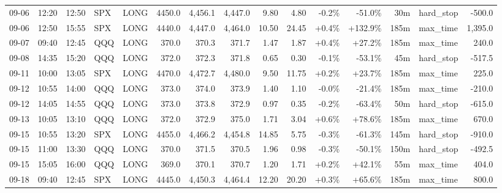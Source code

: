 \documentclass[11pt,a4paper,twoside]{article}
\begin{document}
\begin{landscape}
\begin{center}
\begin{longtable}{>{\color{txtmain}}l l l l l r r r r r r r r >{\color{txtmain}}l r}
09-06 & 12:20 & 12:50 & SPX & LONG & 4450.0 & 4,456.1 & 4,447.0 & 9.80 & 4.80 & \textcolor{lossred}{-0.2\%} & \textcolor{lossred}{-51.0\%} & 30m & hard\_stop & \textcolor{lossred}{-500.0} \\
09-06 & 12:50 & 15:55 & SPX & LONG & 4440.0 & 4,447.0 & 4,464.0 & 10.50 & 24.45 & \textcolor{wingreen}{+0.4\%} & \textcolor{wingreen}{+132.9\%} & 185m & max\_time & \textcolor{wingreen}{1,395.0} \\
09-07 & 09:40 & 12:45 & QQQ & LONG & 370.0 & 370.3 & 371.7 & 1.47 & 1.87 & \textcolor{wingreen}{+0.4\%} & \textcolor{wingreen}{+27.2\%} & 185m & max\_time & \textcolor{wingreen}{240.0} \\
09-08 & 14:35 & 15:20 & QQQ & LONG & 372.0 & 372.3 & 371.8 & 0.65 & 0.30 & \textcolor{lossred}{-0.1\%} & \textcolor{lossred}{-53.1\%} & 45m & hard\_stop & \textcolor{lossred}{-517.5} \\
09-11 & 10:00 & 13:05 & SPX & LONG & 4470.0 & 4,472.7 & 4,480.0 & 9.50 & 11.75 & \textcolor{wingreen}{+0.2\%} & \textcolor{wingreen}{+23.7\%} & 185m & max\_time & \textcolor{wingreen}{225.0} \\
09-12 & 10:55 & 14:00 & QQQ & LONG & 373.0 & 374.0 & 373.9 & 1.40 & 1.10 & \textcolor{lossred}{-0.0\%} & \textcolor{lossred}{-21.4\%} & 185m & max\_time & \textcolor{lossred}{-210.0} \\
09-12 & 14:05 & 14:55 & QQQ & LONG & 373.0 & 373.8 & 372.9 & 0.97 & 0.35 & \textcolor{lossred}{-0.2\%} & \textcolor{lossred}{-63.4\%} & 50m & hard\_stop & \textcolor{lossred}{-615.0} \\
09-13 & 10:05 & 13:10 & QQQ & LONG & 372.0 & 372.9 & 375.0 & 1.71 & 3.04 & \textcolor{wingreen}{+0.6\%} & \textcolor{wingreen}{+78.6\%} & 185m & max\_time & \textcolor{wingreen}{670.0} \\
09-15 & 10:55 & 13:20 & SPX & LONG & 4455.0 & 4,466.2 & 4,454.8 & 14.85 & 5.75 & \textcolor{lossred}{-0.3\%} & \textcolor{lossred}{-61.3\%} & 145m & hard\_stop & \textcolor{lossred}{-910.0} \\
09-15 & 11:00 & 13:30 & QQQ & LONG & 370.0 & 371.5 & 370.5 & 1.96 & 0.98 & \textcolor{lossred}{-0.3\%} & \textcolor{lossred}{-50.1\%} & 150m & hard\_stop & \textcolor{lossred}{-492.5} \\
09-15 & 15:05 & 16:00 & QQQ & LONG & 369.0 & 370.1 & 370.7 & 1.20 & 1.71 & \textcolor{wingreen}{+0.2\%} & \textcolor{wingreen}{+42.1\%} & 55m & max\_time & \textcolor{wingreen}{404.0} \\
09-18 & 09:40 & 12:45 & SPX & LONG & 4445.0 & 4,450.3 & 4,464.4 & 12.20 & 20.20 & \textcolor{wingreen}{+0.3\%} & \textcolor{wingreen}{+65.6\%} & 185m & max\_time & \textcolor{wingreen}{800.0} \\

\end{longtable}
\end{center}
\end{landscape}
\end{document}
